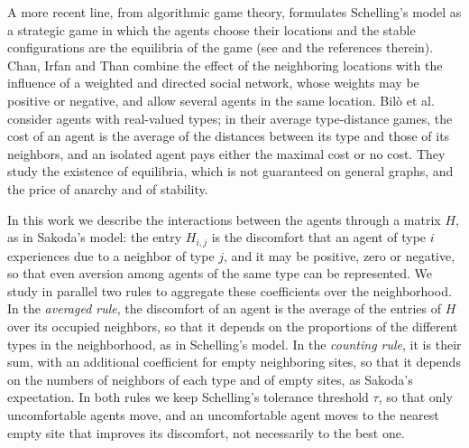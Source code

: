 \documentclass{article}
\theoremstyle{remark}
\begin{document}
A more recent line, from algorithmic game theory, formulates Schelling's model as a strategic game in which the agents choose their locations and the stable configurations are the equilibria of the game (see \cite{chan2020schelling,bilo2023schelling} and the references therein). Chan, Irfan and Than \cite{chan2020schelling} combine the effect of the neighboring locations with the influence of a weighted and directed social network, whose weights may be positive or negative, and allow several agents in the same location. Bil\`o et al.\ \cite{bilo2023schelling} consider agents with real-valued types; in their average type-distance games, the cost of an agent is the average of the distances between its type and those of its neighbors, and an isolated agent pays either the maximal cost or no cost. They study the existence of equilibria, which is not guaranteed on general graphs, and the price of anarchy and of stability.

In this work we describe the interactions between the agents through a matrix $H$, as in Sakoda's model: the entry $H_{i,j}$ is the discomfort that an agent of type $i$ experiences due to a neighbor of type $j$, and it may be positive, zero or negative, so that even aversion among agents of the same type can be represented. We study in parallel two rules to aggregate these coefficients over the neighborhood. In the \emph{averaged rule}, the discomfort of an agent is the average of the entries of $H$ over its occupied neighbors, so that it depends on the proportions of the different types in the neighborhood, as in Schelling's model. In the \emph{counting rule}, it is their sum, with an additional coefficient for empty neighboring sites, so that it depends on the numbers of neighbors of each type and of empty sites, as Sakoda's expectation. In both rules we keep Schelling's tolerance threshold $\tau$, so that only uncomfortable agents move, and an uncomfortable agent moves to the nearest empty site that improves its discomfort, not necessarily to the best one.
\end{document}
